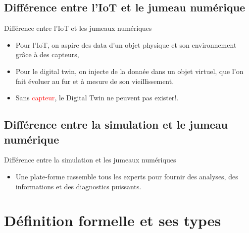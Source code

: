 \documentclass{beamer}
\begin{document}
\subsection{Différence entre l'IoT et le jumeau numérique}
\begin{frame}{Différence entre l'IoT et les jumeaux numériques}
 \begin{itemize}
  \item Pour l'IoT, on aspire des data d'un objet physique et son environnement grâce à des capteurs, 
  \item Pour le digital twin, on injecte de la donnée dans un objet virtuel, que l'on fait évoluer au fur et à mesure de son vieillissement.
  \item Sans \textcolor{red}{capteur}, le Digital Twin ne peuvent pas exister!.
 \end{itemize}
\end{frame}
\subsection{Différence entre la simulation et le jumeau numérique}
\begin{frame}{ Différence entre la simulation et les jumeaux numériques}
 \begin{itemize}
   \item Une plate-forme rassemble tous les experts pour fournir des analyses, des informations et des 
   diagnostics puissants.
 \end{itemize}
\end{frame}
  \section{Définition formelle et ses types}
\end{document}
